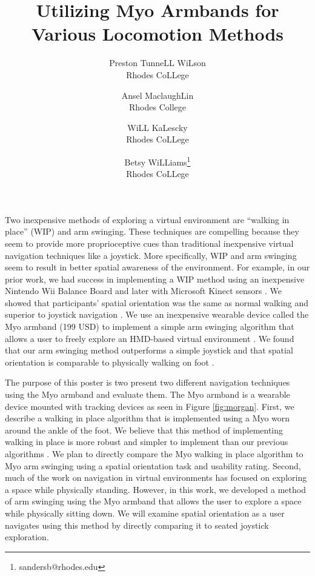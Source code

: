 \documentclass{vgtc}                          %
\title{Utilizing Myo Armbands for Various Locomotion Methods}
\author{Preston TunneLL WiLson\\ %
  \scriptsize Rhodes CoLLege %
  \and Ansel MaclaughLin\\ %
  \scriptsize Rhodes College %
  \and WiLL KaLescky\\ %
  \scriptsize{Rhodes CoLLege}%
  \and Betsy WiLLiams\thanks{sandersb@rhodes.edu}\\ %
  \scriptsize Rhodes CoLLege}
\begin{document}


\maketitle

Two inexpensive methods of exploring a virtual environment are ``walking in place'' (WIP) and arm swinging.
These techniques are compelling because they seem to provide more proprioceptive cues than traditional inexpensive virtual navigation techniques like a joystick.
More specifically, WIP and arm swinging seem to result in better spatial awareness of the environment.
For example, in our prior work, we had success in implementing a WIP method using an inexpensive Nintendo Wii Balance Board \cite{Williams:2011:EWP} and later with Microsoft Kinect sensors \cite{Wilson:2014}.
We showed that participants' spatial orientation was the same as normal walking and superior to joystick navigation \cite{Williams:2011:EWP}.
We use an inexpensive wearable device called the Myo armband (199 USD) to implement a simple arm swinging algorithm that allows a user to freely explore an HMD-based virtual environment \cite{previousMYO}.
We found that our arm swinging method outperforms a simple joystick and that spatial orientation is comparable to physically walking on foot \cite{previousMYO}.


The purpose of this poster is two present two different navigation techniques using the Myo armband and evaluate them.
The Myo armband is a wearable device mounted with tracking devices as seen in Figure \ref{fig:morgan}.
First, we describe a walking in place algorithm that is implemented using a Myo worn around the ankle of the foot.
We believe that this method of implementing walking in place is more robust and simpler to implement than our previous algorithms \cite{Williams:2011:EWP,Wilson:2014}.
We plan to directly compare the Myo walking in place algorithm to Myo arm swinging using a spatial orientation task and usability rating.
Second, much of the work on navigation in virtual environments has focused on exploring a space while physically standing.
However, in this work, we developed a method of arm swinging using the Myo armband that allows the user to explore a space while physically sitting down.
We will examine spatial orientation as a user navigates using this method by directly comparing it to seated joystick exploration.
\end{document}
